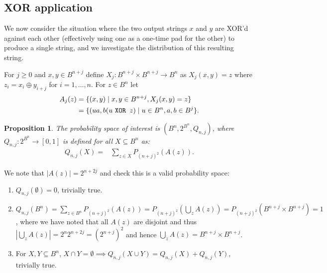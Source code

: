 \documentclass{mscs}
\newtheorem{Proposition}[Theorem]{Proposition}
\begin{document}
\subsection{XOR application}

We now consider the situation where the two output strings $x$ and $y$ are XOR'd against each other (effectively using one as a one-time pad for the other) to produce a single string, and we investigate the distribution of this resulting string.

For $j\ge 0$ and $x,y \in B^{n+j}$ define $X_j: B^{n+j} \times B^{n+j} \to B^n$ as $X_j(x,y) = z$ where $z_i = x_i \oplus y_{i+j}$ for $i=1,\dots,n$. For $z \in B^n$ let
\begin{align*}
	A_j(z) &= \{(x,y) \mid x,y \in B^{n+j}, X_j(x,y)=z \}\\
	&= \{(ua,b(u \text{ \tt XOR } z) \mid u \in B^n, a,b\in B^j \}.
\end{align*}
\begin{Proposition}
 The probability space of interest is $(B^n,2^{B^n},Q_{n,j})$, where $Q_{n,j}: 2^{B^n} \to [0,1]$ is defined for all $X\subseteq B^n$ as:
\begin{align*}
	Q_{n,j}(X) =& \sum_{z\in X}P_{(n+j)^2}(A(z)).
\end{align*}
\end{Proposition}
We note that $|A(z)| = 2^{n+2j}$ and check this is a valid probability space:
\begin{enumerate}
	\item $Q_{n,j}(\emptyset) = 0$, trivially true.
	\item $Q_{n,j}(B^n) = \sum_{z\in B^n}P_{(n+j)^2}(A(z)) = P_{(n+j)^2}(\bigcup_z A(z)) = P_{(n+j)^2}(B^{n+j}\times B^{n+j}) = 1$, where we have noted that all $A(z)$ are disjoint and thus $|\bigcup_z A(z)| = 2^n 2^{n+2j} = (2^{n+j})^2$ and hence $\bigcup_z A(z) = B^{n+j}\times B^{n+j}$.
	\item For $X,Y \subseteq B^n$, $X\cap Y = \emptyset \implies Q_{n,j}(X\cup Y) = Q_{n,j}(X) + Q_{n,j}(Y)$, trivially true.
\end{enumerate}
\end{document}
